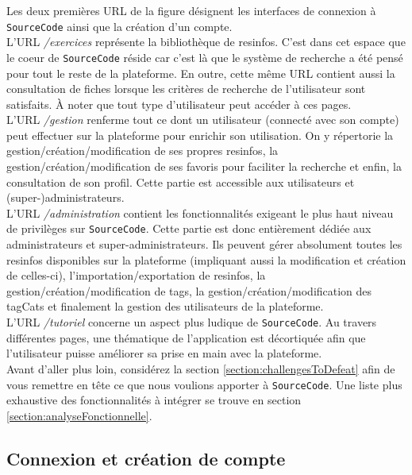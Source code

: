 Les deux premières URL de la figure désignent les interfaces de connexion à \texttt{SourceCode} ainsi que la création d'un compte.\\

L'URL \textit{/exercices} représente la bibliothèque de \glspl{resinfo}. C'est dans cet espace que le coeur de \texttt{SourceCode} réside car c'est là que le système de recherche a été pensé pour tout le reste de la plateforme. En outre,
cette même URL contient aussi la consultation de \glspl{fiche} lorsque les critères de recherche de l'utilisateur sont satisfaits. À noter que tout type d'utilisateur peut accéder à ces pages.\\

L'URL \textit{/gestion} renferme tout ce dont un utilisateur (connecté avec son compte) peut effectuer sur la plateforme pour enrichir son utilisation. On y répertorie la gestion/création/modification de ses propres \glspl{resinfo}, la gestion/création/modification de ses favoris pour faciliter la recherche et enfin, la consultation de son profil. Cette partie est accessible aux utilisateurs et (super-)administrateurs.\\

L'URL \textit{/administration} contient les fonctionnalités exigeant le plus haut niveau de privilèges sur \texttt{SourceCode}. Cette partie est donc entièrement dédiée aux administrateurs et super-administrateurs. Ils peuvent gérer absolument toutes les \glspl{resinfo} disponibles sur la plateforme (impliquant aussi la modification et création de celles-ci), l'importation/exportation de \glspl{resinfo}, la gestion/création/modification de \glspl{tag}, la gestion/création/modification des \glspl{tagCat} et finalement la gestion des utilisateurs de la plateforme.\\

L'URL \textit{/tutoriel} concerne un aspect plus ludique de \texttt{SourceCode}. Au travers différentes pages, une thématique de l'application est décortiquée afin que l'utilisateur puisse améliorer sa prise en main avec la plateforme.\\

Avant d'aller plus loin, considérez la section \ref{section:challengesToDefeat} afin de vous remettre en tête ce que nous voulions apporter à \texttt{SourceCode}. Une liste plus exhaustive des fonctionnalités à intégrer se trouve en section \ref{section:analyseFonctionnelle}.

\subsection{Connexion et création de compte}

